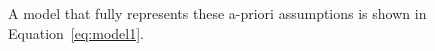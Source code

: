 A model that fully represents these a-priori assumptions is shown in Equation~\ref{eq:model1}.
\begin{align}
    
\end{align}
